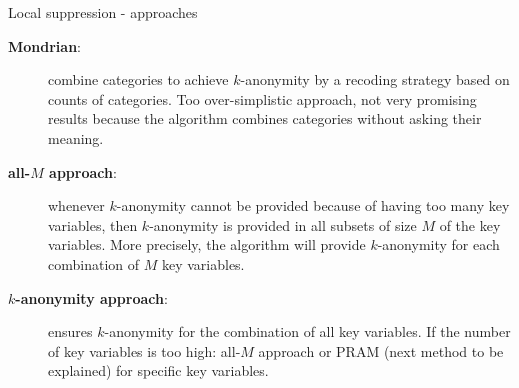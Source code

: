 \documentclass[ignorenonframetext,]{beamer}
\begin{document}
\begin{frame}{Local suppression - approaches}
\protect\hypertarget{local-suppression---approaches}{}

\begin{description}
\item[\textbf{Mondrian}:] combine categories to achieve $k$-anonymity by a recoding strategy based on counts of categories. Too over-simplistic approach, not very promising results because the algorithm combines categories without asking their meaning. 
\item[\textbf{all-$M$ approach}:] whenever $k$-anonymity cannot be provided because of having too many key variables, then $k$-anonymity is provided in all subsets of size $M$ of the key variables. More precisely, the algorithm will provide $k$-anonymity for each combination of $M$ key variables. 
\item[\textbf{$k$-anonymity approach}:] ensures $k$-anonymity for the combination of all key variables. If the number of key variables is too high: all-$M$ approach or PRAM (next method to be explained) for specific key variables. 
\end{description}

\end{frame}
\end{document}
